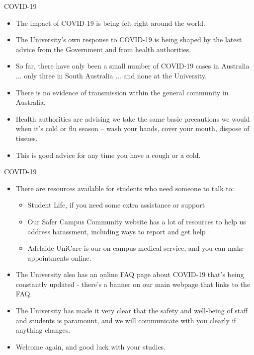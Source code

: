 \documentclass[aspectratio=169,11pt]{beamer}
\begin{document}
\begin{frame}{COVID-19}

	\begin{itemize}
		\item The impact of COVID-19 is being felt right around the world. 
		\item The University's own response to COVID-19 is being shaped by the latest advice from the Government and from health authorities. 
		\item So far, there have only been a small number of COVID-19 cases in Australia ... only three in South Australia  ... and none at the University.	
		\item There is no evidence of transmission within the general community in Australia.
		\item Health authorities are advising we take the same basic precautions we would when it's cold or flu season – wash your hands, cover your mouth, dispose of tissues.
		\item This is good advice for any time you have a cough or a cold.	
 
	\end{itemize}

\end{frame}

\begin{frame}{COVID-19}

	\begin{itemize}
		\item There are resources available for students who need someone to talk to:
		
		\begin{itemize}
			\item Student Life, if you need some extra assistance or support
			\item Our Safer Campus Community website has a lot of resources to help us address harassment, including ways to report and get help
			\item Adelaide UniCare is our on-campus medical service, and you can make appointments online.
		\end{itemize}
		
		\item The University also has an online FAQ page about COVID-19 that's being constantly updated - there's a banner on our main webpage that links to the FAQ.
		\item The University has made it very clear that the safety and well-being of staff and students is paramount, and we will communicate with you clearly if anything changes.
		\item Welcome again, and good luck with your studies.
	\end{itemize}

\end{frame}
\end{document}
